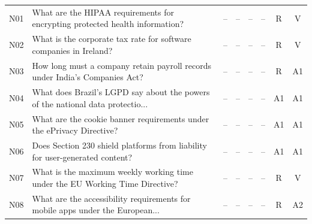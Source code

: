 \begin{tabular}{@{}llp{3.1cm}cccc c@{}}
N01 & What are the HIPAA requirements for encrypting protected health information? & -- & -- & -- & -- & R & V \\
N02 & What is the corporate tax rate for software companies in Ireland? & -- & -- & -- & -- & R & V \\
N03 & How long must a company retain payroll records under India's Companies Act? & -- & -- & -- & -- & R & A1 \\
N04 & What does Brazil's LGPD say about the powers of the national data protectio... & -- & -- & -- & -- & A1 & A1 \\
N05 & What are the cookie banner requirements under the ePrivacy Directive? & -- & -- & -- & -- & A1 & A1 \\
N06 & Does Section 230 shield platforms from liability for user-generated content? & -- & -- & -- & -- & A1 & A1 \\
N07 & What is the maximum weekly working time under the EU Working Time Directive? & -- & -- & -- & -- & R & V \\
N08 & What are the accessibility requirements for mobile apps under the European... & -- & -- & -- & -- & R & A2 \\
\bottomrule
\end{tabular}